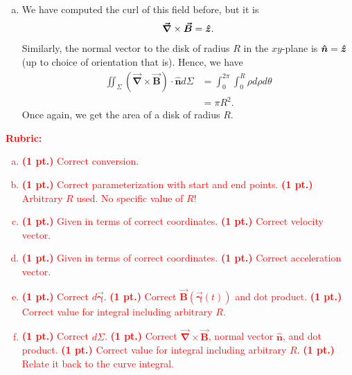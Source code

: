 \documentclass[12pt]{article} %
\newcommand{\grad}{\boldsymbol{\vec{\nabla}}}
\newcommand{\curvegamma}{\boldsymbol{\vec{\gamma}}}
\newcommand{\unitvec}{\boldsymbol{\hat{n}}}
\newcommand{\vecfieldB}{\boldsymbol{\vec{B}}}
\begin{document}
\begin{solution}
\begin{enumerate}[(a)]
	\item We have computed the curl of this field before, but it is
	\[
\grad \times \vecfieldB = \zhat.
	\]
Similarly, the normal vector to the disk of radius $R$ in the $xy$-plane is $\unitvec = \zhat$ (up to choice of orientation that is). Hence, we have
\begin{align*}
	\iint_{\Sigma} (\grad \times \vecfieldB) \cdot \unitvec d \Sigma  &= \int_0^{2\pi } \int_{0}^R \rho d \rho d \theta\\
	&= \pi R^2.
\end{align*}
Once again, we get the area of a disk of radius $R$.
\end{enumerate}
\end{solution}
\vspace*{1cm}
\textcolor{red}{
\noindent \textbf{Rubric:}
\begin{enumerate}[(a)]
    \item \textbf{(1 pt.)} Correct conversion. 
    \item \textbf{(1 pt.)} Correct parameterization with start and end points. \textbf{(1 pt.)} Arbitrary $R$ used. No specific value of $R$!
    \item \textbf{(1 pt.)} Given in terms of correct coordinates. \textbf{(1 pt.)} Correct velocity vector.
    \item \textbf{(1 pt.)} Given in terms of correct coordinates. \textbf{(1 pt.)} Correct acceleration vector.
	\item \textbf{(1 pt.)} Correct $d \curvegamma$. \textbf{(1 pt.)} Correct $\vecfieldB(\curvegamma(t))$ and dot product. \textbf{(1 pt.)} Correct value for integral including arbitrary $R$.
	\item \textbf{(1 pt.)} Correct $d \Sigma$. \textbf{(1 pt.)} Correct $\grad \times \vecfieldB$, normal vector $\unitvec$, and dot product. \textbf{(1 pt.)} Correct value for integral including arbitrary $R$. \textbf{(1 pt.)} Relate it back to the curve integral.
\end{enumerate}
}
\end{document}
